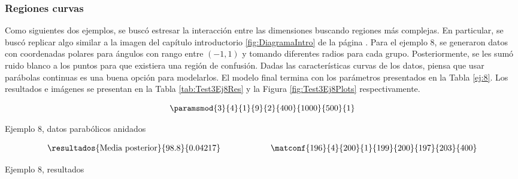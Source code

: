 \subsubsection{Regiones curvas}
Como siguientes dos ejemplos, se buscó estresar la interacción entre las dimensiones buscando regiones más complejas. En particular, se buscó replicar algo similar a la imagen del capítulo introductorio \ref{fig:DiagramaIntro} de la página \pageref{fig:DiagramaIntro}. Para el ejemplo 8, se generaron datos con coordenadas polares para ángulos con rango entre $(-1,1)$ y tomando diferentes radios para cada grupo. Posteriormente, se les sumó ruido blanco a los puntos para que existiera una región de confusión. Dadas las características curvas de los datos, piensa que usar parábolas continuas es una buena opción para modelarlos. El modelo final termina con los parámetros presentados en la Tabla \ref{ej:8}. Los resultados e imágenes se presentan en la Tabla \ref{tab:Test3Ej8Res} y la Figura \ref{fig:Test3Ej8Plots} respectivamente.

\begin{table}[h]
$$\paramsmod{3}{4}{1}{9}{2}{400}{1000}{500}{1}$$
\caption{Ejemplo 8, datos parabólicos anidados}
\label{ej:8}
\end{table}

\begin{table}[h]
\begin{align*}
\resultados{\text{Media posterior}}{98.8}{0.04217}
\qquad\qquad\qquad
\matconf{196}{4}{200}{1}{199}{200}{197}{203}{400}
\end{align*}
\caption{Ejemplo 8, resultados}
\label{tab:Test3Ej8Res}
\end{table}

